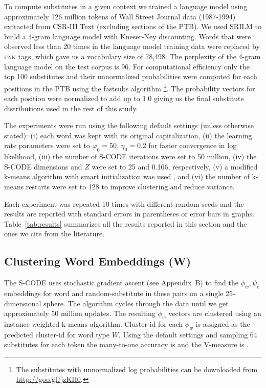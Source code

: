 To compute substitutes in a given context we trained a language model
using approximately 126 million tokens of Wall Street Journal data
(1987-1994) extracted from CSR-III Text \cite{csr3text} (excluding
sections of the PTB).
We used SRILM \cite{Stolcke2002} to build a 4-gram language model with
Kneser-Ney discounting.
Words that were observed less than 20 times in the language model
training data were replaced by \textsc{unk} tags, which gave us a
vocabulary size of 78,498.
The perplexity of the 4-gram language model on the test corpus is 96.
For computational efficiency only the top 100 substitutes and their
unnormalized probabilities were computed for each positions in the PTB
using the {\sc fastsubs} algorithm
\cite{yuret2012fastsub}\footnote{The substitutes with unnormalized log
  probabilities can be downloaded from
  \mbox{\url{http://goo.gl/jzKH0}}.}.  The probability vectors for
each position were normalized to add up to 1.0 giving us the final
substitute distributions used in the rest of this study.

The experiments were run using the following default settings (unless
otherwise stated): (i) each word was kept with its original
capitalization, (ii) the learning rate parameters were set to
$\varphi_0=50$, $\eta_0=0.2$ for faster convergence in log likelihood,
(iii) the number of S-CODE iterations were set to 50 million, (iv) the
S-CODE dimensions and $Z$ were set to 25 and 0.166, respectively, (v)
a modified k-means algorithm with smart initialization was used
\cite{arthur2007k}, and (vi) the number of k-means restarts were set
to 128 to improve clustering and reduce variance.

Each experiment was repeated 10 times with different random seeds and
the results are reported with standard errors in parentheses or error
bars in graphs.  Table~\ref{tab:results} summarizes all the results
reported in this section and the ones we cite from the literature.

\subsection{Clustering Word Embeddings ({\bf W})}
\label{sec:clustering-w}

The S-CODE uses stochastic gradient ascent (see Appendix~B) to find
the $\phi_w, \psi_c$ embeddings for word and random-substitute in
these pairs on a single 25-dimensional sphere.  The algorithm cycles
through the data until we get approximately 50 million updates.  The
resulting $\phi_w$ vectors are clustered using an instance weighted
k-means algorithm.  Cluster-id for each $\phi_w$ is assigned as the
predicted cluster-id for word type $W$.  Using the default settings
and sampling 64 substitutes for each token the many-to-one accuracy is
\wsmto and the V-measure is \wsvm.

